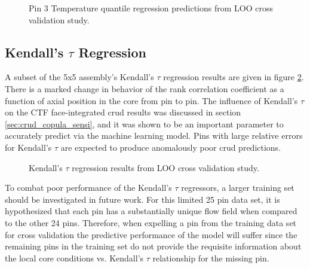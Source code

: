 \begin{figure}[H]%
    \centering
    \qquad
    \caption[Q-Q LOO Temperature pin 3 results.]{Pin 3 Temperature quantile regression predictions from LOO cross validation study.}%
    \label{fig:temppin3}%
\end{figure}

\subsection{Kendall's $\tau$ Regression}

A subset of the 5x5 assembly's Kendall's $\tau$ regression results are given in figure \ref{fig:ktauregression}.  There is a marked change in behavior of the rank correlation coefficient as a function of axial position in the core from pin to pin.  The influence of Kendall's $\tau$ on the CTF face-integrated crud results was discussed in section \ref{sec:crud_copula_sensi}, and it was shown to be an important parameter to accurately predict via the machine learning model.  Pins with large relative errors for Kendall's $\tau$ are expected to produce anomalously poor crud predictions.

\begin{figure}[H]%
    \centering
    \qquad
    \qquad
    \qquad
    \qquad
    \caption[Kendall's $\tau$ regression LOO results.]{Kendall's $\tau$ regression results from LOO cross validation study.}%
    \label{fig:ktauregression}%
\end{figure}
To combat poor performance of the Kendall's $\tau$ regressors, a larger training set should be investigated in future work.  For this limited 25 pin data set, it is hypothesized that each pin has a substantially unique flow field when compared to the other 24 pins.  Therefore, when expelling a pin from the training data set for cross validation the predictive performance of the model will suffer since the remaining pins in the training set do not provide the requisite information about the local core conditions vs. Kendall's $\tau$ relationship for the missing pin.

